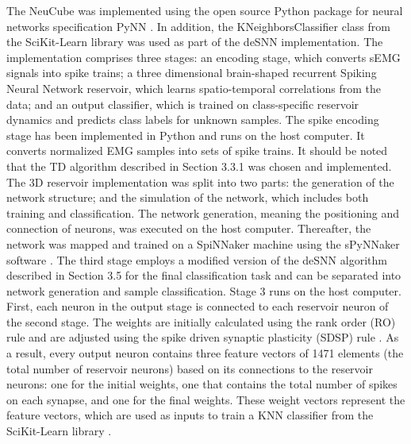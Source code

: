 \documentclass[journal,article,submit,moreauthors,pdftex,10pt,a4paper]{Definitions/mdpi}
\begin{document}
The NeuCube was implemented using the open source Python package for neural networks specification PyNN \cite{42}. In addition, the KNeighborsClassifier class from the SciKit-Learn library \cite{43} was used as part of the deSNN implementation. The implementation comprises three stages: an encoding stage, which converts sEMG signals into spike trains; a three dimensional brain-shaped recurrent Spiking Neural Network reservoir, which learns spatio-temporal correlations from the data; and an output classifier, which is trained on class-specific reservoir dynamics and predicts class labels for unknown samples. 
The spike encoding stage has been implemented in Python and runs on the host computer. It converts normalized EMG samples into sets of spike trains. It should be noted that the TD algorithm described in Section 3.3.1 was chosen and implemented. 
The 3D reservoir implementation was split into two parts: the generation of the network structure; and the simulation of the network, which includes both training and classification. The network generation, meaning the positioning and connection of neurons, was executed on the host computer. Thereafter, the network was mapped and trained on a SpiNNaker machine using the sPyNNaker software \cite{44}. 
The third stage employs a modified version of the deSNN algorithm described in Section 3.5 for the final classification task and can be separated into network generation and sample classification. Stage 3 runs on the host computer. First, each neuron in the output stage is connected to each reservoir neuron of the second stage. The weights are initially calculated using the rank order (RO) rule \cite{45} and are adjusted using the spike driven synaptic plasticity (SDSP) rule \cite{46}. As a result, every output neuron contains three feature vectors of 1471 elements (the total number of reservoir neurons) based on its connections to the reservoir neurons: one for the initial weights, one that contains the total number of spikes on each synapse, and one for the final weights. These weight vectors represent the feature vectors, which are used as inputs to train a KNN classifier from the SciKit-Learn library \cite{43}. 
\end{document}

